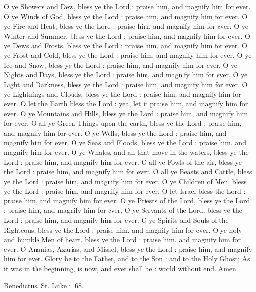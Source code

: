 O ye Showers and Dew, bless ye the Lord : praise him, and magnify him for ever.
O ye Winds of God, bless ye the Lord : praise him, and magnify him for ever.
O ye Fire and Heat, bless ye the Lord : praise him, and magnify him for ever.
O ye Winter and Summer, bless ye the Lord : praise him, and magnify him for ever.
O ye Dews and Frosts, bless ye the Lord : praise him, and magnify him for ever.
O ye Frost and Cold, bless ye the Lord : praise him, and magnify him for ever.
O ye Ice and Snow, bless ye the Lord : praise him, and magnify him for ever.
O ye Nights and Days, bless ye the Lord : praise him, and magnify him for ever.
O ye Light and Darkness, bless ye the Lord : praise him, and magnify him for ever.
O ye Lightnings and Clouds, bless ye the Lord : praise him, and magnify him for ever.
O let the Earth bless the Lord : yea, let it praise him, and magnify him for ever.
O ye Mountains and Hills, bless ye the Lord : praise him, and magnify him for ever.
O all ye Green Things upon the earth, bless ye the Lord : praise him, and magnify him for ever.
O ye Wells, bless ye the Lord : praise him, and magnify him for ever.
O ye Seas and Floods, bless ye the Lord : praise him, and magnify him for ever.
O ye Whales, and all that move in the waters, bless ye the Lord : praise him, and magnify him for ever.
O all ye Fowls of the air, bless ye the Lord : praise him, and magnify him for ever.
O all ye Beasts and Cattle, bless ye the Lord : praise him, and magnify him for ever.
O ye Children of Men, bless ye the Lord : praise him, and magnify him for ever.
O let Israel bless the Lord : praise him, and magnify him for ever.
O ye Priests of the Lord, bless ye the Lord : praise him, and magnify him for ever.
O ye Servants of the Lord, bless ye the Lord : praise him, and magnify him for ever.
O ye Spirits and Souls of the Righteous, bless ye the Lord : praise him, and magnify him for ever.
O ye holy and humble Men of heart, bless ye the Lord : praise him, and magnify him for ever.
O Ananias, Azarias, and Misael, bless ye the Lord : praise him, and magnify him for ever.
Glory be to the Father, and to the Son : and to the Holy Ghost;
As it was in the beginning, is now, and ever shall be : world without end. Amen.


Benedictus.
St. Luke i. 68.

